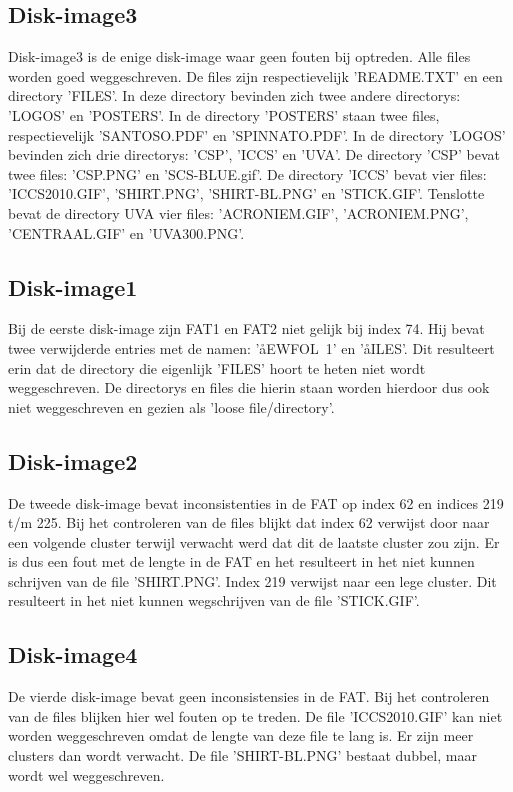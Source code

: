 \documentclass[11pt]{article}
\begin{document}
	\subsection{Disk-image3}\label{sec:disk3}
	Disk-image3 is de enige disk-image waar geen fouten bij optreden. Alle files worden goed weggeschreven. De files zijn respectievelijk 'README.TXT' en een directory 'FILES'. In deze directory bevinden zich twee andere directorys: 'LOGOS' en 'POSTERS'. In de directory 'POSTERS' staan twee files, respectievelijk 'SANTOSO.PDF' en 'SPINNATO.PDF'. In de directory 'LOGOS' bevinden zich drie directorys: 'CSP', 'ICCS' en 'UVA'. De directory 'CSP' bevat twee files: 'CSP.PNG' en 'SCS-BLUE.gif'. De directory 'ICCS' bevat vier files: 'ICCS2010.GIF', 'SHIRT.PNG', 'SHIRT-BL.PNG' en 'STICK.GIF'. Tenslotte bevat de directory UVA vier files: 'ACRONIEM.GIF', 'ACRONIEM.PNG', 'CENTRAAL.GIF' en 'UVA300.PNG'.

	\subsection{Disk-image1}\label{sec:disk1}
	Bij de eerste disk-image zijn FAT1 en FAT2 niet gelijk bij index 74. Hij bevat twee verwijderde entries met de namen: 'åEWFOL~1' en 'åILES'. Dit resulteert erin dat de directory die eigenlijk 'FILES' hoort te heten niet wordt weggeschreven. De directorys en files die hierin staan worden hierdoor dus ook niet weggeschreven en gezien als 'loose file/directory'.

	\subsection{Disk-image2}\label{sec:disk2}
	De tweede disk-image bevat inconsistenties in de FAT op index 62 en indices 219 t/m 225. Bij het controleren van de files blijkt dat index 62 verwijst door naar een volgende cluster terwijl verwacht werd dat dit de laatste cluster zou zijn. Er is dus een fout met de lengte in de FAT en het resulteert in het niet kunnen schrijven van de file 'SHIRT.PNG'. Index 219 verwijst naar een lege cluster. Dit resulteert in het niet kunnen wegschrijven van de file 'STICK.GIF'.

	\subsection{Disk-image4}\label{sec:disk4}
	De vierde disk-image bevat geen inconsistensies in de FAT. Bij het controleren van de files blijken hier wel fouten op te treden. De file 'ICCS2010.GIF' kan niet worden weggeschreven omdat de lengte van deze file te lang is. Er zijn meer clusters dan wordt verwacht. De file 'SHIRT-BL.PNG' bestaat dubbel, maar wordt wel weggeschreven. 
\end{document}
